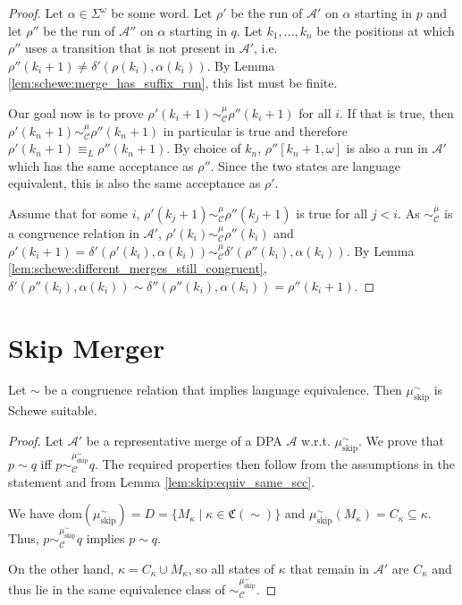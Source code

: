 \begin{proof}
	Let $\alpha \in \Sigma^\omega$ be some word. Let $\rho'$ be the run of $\mathcal{A}'$ on $\alpha$ starting in $p$ and let $\rho''$ be the run of $\mathcal{A}''$ on $\alpha$ starting in $q$. Let $k_1, \dots, k_n$ be the positions at which $\rho''$ uses a transition that is not present in $\mathcal{A}'$, i.e. $\rho''(k_i + 1) \neq \delta'(\rho(k_i), \alpha(k_i))$. By Lemma \ref{lem:schewe:merge_has_suffix_run}, this list must be finite. 
	
	Our goal now is to prove $\rho'(k_i + 1) \sim_\mathcal{C}^\mu \rho''(k_i + 1)$ for all $i$. If that is true, then $\rho'(k_n + 1) \sim_\mathcal{C}^\mu \rho''(k_n + 1)$ in particular is true and therefore $\rho'(k_n + 1) \equiv_L \rho''(k_n + 1)$. By choice of $k_n$, $\rho''[k_n + 1, \omega]$ is also a run in $\mathcal{A}'$ which has the same acceptance as $\rho''$. Since the two states are language equivalent, this is also the same acceptance as $\rho'$.
	
	Assume that for some $i$, $\rho'(k_j + 1) \sim_\mathcal{C}^\mu \rho''(k_j + 1)$ is true for all $j < i$. As $\sim_\mathcal{C}^\mu$ is a congruence relation in $\mathcal{A}'$, $\rho'(k_i) \sim_\mathcal{C}^\mu \rho''(k_i)$ and $\rho'(k_i + 1) = \delta'(\rho'(k_i), \alpha(k_i)) \sim_\mathcal{C}^\mu \delta'(\rho''(k_i), \alpha(k_i))$. By Lemma \ref{lem:schewe:different_merges_still_congruent}, $\delta'(\rho''(k_i), \alpha(k_i)) \sim \delta''(\rho''(k_i), \alpha(k_i)) = \rho''(k_i + 1)$.
\end{proof}


\section{Skip Merger}

\begin{lem}
	Let $\sim$ be a congruence relation that implies language equivalence. Then $\mu_\text{skip}^\sim$ is Schewe suitable.
	\label{lem:schewe:skip_suitable}
\end{lem}

\begin{proof}
	Let $\mathcal{A}'$ be a representative merge of a DPA $\mathcal{A}$ w.r.t. $\mu_\text{skip}^\sim$. We prove that $p \sim q$ iff $p \sim_\mathcal{C}^{\mu_\text{skip}^\sim} q$. The required properties then follow from the assumptions in the statement and from Lemma \ref{lem:skip:equiv_same_scc}.
	
	We have $\text{dom}(\mu_\text{skip}^\sim) = D = \{M_\kappa \mid \kappa \in \mathfrak{C}(\sim)\}$ and $\mu_\text{skip}^\sim(M_\kappa) = C_\kappa \subseteq \kappa$. Thus, $p \sim_\mathcal{C}^{\mu_\text{skip}^\sim} q$ implies $p \sim q$.
	
	On the other hand, $\kappa = C_\kappa \cup M_\kappa$, so all states of $\kappa$ that remain in $\mathcal{A}'$ are $C_\kappa$ and thus lie in the same equivalence class of $\sim_\mathcal{C}^{\mu_\text{skip}^\sim}.$
\end{proof}


